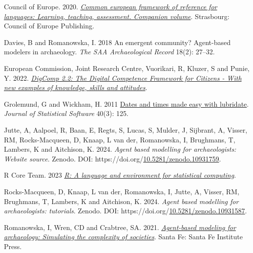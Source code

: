 \documentclass[
]{article}
\newlength{\cslhangindent}
\newlength{\cslentryspacingunit} %
\newenvironment{CSLReferences}[2] %
 {%
  \setlength{\parindent}{0pt}
  \ifodd #1
  \let\oldpar\par
  \def\par{\hangindent=\cslhangindent\oldpar}
  \fi
  \setlength{\parskip}{#2\cslentryspacingunit}
 }%
 {}
\begin{document}
\hypertarget{refs}{}
\begin{CSLReferences}{1}{0}
\leavevmode{}%
Council of Europe. 2020. \emph{\href{http://www.coe.int/lang-cefr}{Common european framework of reference for languages: Learning, teaching, assessment. Companion volume}}. Strasbourg: Council of Europe Publishing.

\leavevmode{}%
Davies, B and Romanowska, I. 2018 An emergent community? Agent-based modelers in archaeology. \emph{The SAA Archaeological Record} 18(2): 27--32.

\leavevmode{}%
European Commission, Joint Research Centre, Vuorikari, R, Kluzer, S and Punie, Y. 2022. \emph{\href{https://data.europa.eu/doi/10.2760/115376}{DigComp 2.2: The Digital Competence Framework for Citizens - With new examples of knowledge, skills and attitudes}}.

\leavevmode{}%
Grolemund, G and Wickham, H. 2011 \href{https://www.jstatsoft.org/v40/i03/}{Dates and times made easy with lubridate}. \emph{Journal of Statistical Software} 40(3): 125.

\leavevmode{}%
Jutte, A, Aalpoel, R, Baan, E, Regts, S, Lucas, S, Mulder, J, Sijbrant, A, Visser, RM, Rocks-Macqueen, D, Knaap, L van der, Romanowska, I, Brughmans, T, Lambers, K and Aitchison, K. 2024. \emph{Agent based modelling for archaeologists: Website source}. Zenodo. DOI: https://doi.org/\href{https://doi.org/10.5281/zenodo.10931759}{10.5281/zenodo.10931759}.

\leavevmode{}%
R Core Team. 2023 \emph{\href{https://www.R-project.org/}{R: A language and environment for statistical computing}}.

\leavevmode{}%
Rocks-Macqueen, D, Knaap, L van der, Romanowska, I, Jutte, A, Visser, RM, Brughmans, T, Lambers, K and Aitchison, K. 2024. \emph{Agent based modelling for archaeologists: tutorials}. Zenodo. DOI: https://doi.org/\href{https://doi.org/10.5281/zenodo.10931587}{10.5281/zenodo.10931587}.

\leavevmode{}%
Romanowska, I, Wren, CD and Crabtree, SA. 2021. \emph{\href{https://www.sfipress.org/books/agent-based-modeling-archaeology}{Agent-based modeling for archaeology: Simulating the complexity of societies}}. Santa Fe: Santa Fe Institute Press.


\end{CSLReferences}
\end{document}
